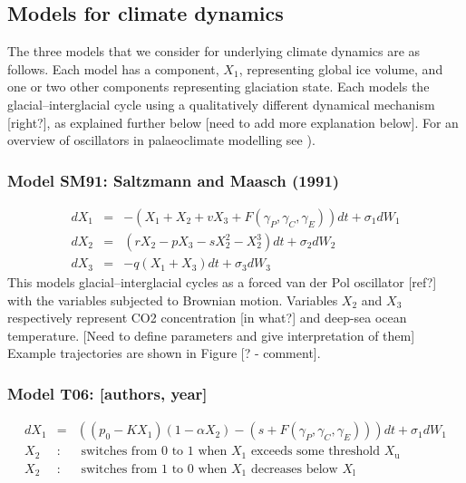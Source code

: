 \documentclass[a4paper,12pt]{article}
\begin{document}
\subsection{Models for climate dynamics}

The three models that we consider for underlying climate dynamics are as follows.  Each
model has a component, $X_1$, representing global ice volume, and one or two other
components representing glaciation state.  Each models the glacial--interglacial cycle
using a qualitatively different dynamical mechanism [right?], as explained further below 
[need to add more explanation below].  For an overview of oscillators in palaeoclimate modelling see
\cite{Crucifix2012}).

\subsubsection*{Model SM91: Saltzmann and Maasch (1991)}
\begin{eqnarray*}
dX_1 & = & -\left( X_1 + X_2 + v X_3 + F(\gamma_P,\gamma_C,\gamma_E) \right)dt + \sigma_1 dW_1 \\
dX_2 & = & \left( r X_2 - p X_3 - s X_2^2 - X_2^3 \right)dt + \sigma_2 dW_2 \\
dX_3 & = & -q \left( X_1 + X_3 \right) dt + \sigma_3 dW_3
\end{eqnarray*}
This models glacial--interglacial cycles as a forced van der Pol oscillator [ref?] with the
variables subjected to Brownian motion.  Variables $X_2$ and $X_3$ respectively represent 
CO2 concentration [in
what?] and deep-sea ocean temperature.  [Need to define parameters and give interpretation of them] Example trajectories are shown in Figure [? - comment].

\subsubsection*{Model T06: [authors, year] }
\begin{eqnarray*}
dX_1 & = & \left( \left(p_0 - K X_1 \right) \left(1 - \alpha X_2 \right) - \left(s + F(\gamma_P,\gamma_C,\gamma_E) \right) \right) dt + \sigma_1 dW_1 \\
  X_2 & : & \mbox{ switches from } 0 \mbox{ to } 1 \mbox{              when $X_1$ exceeds some threshold $X_\text{u}$} \\
  X_2 & : & \mbox{ switches from } 1 \mbox{ to } 0 \mbox{              when $X_1$ decreases below $X_\text{l}$}
\end{eqnarray*}
\end{document}
